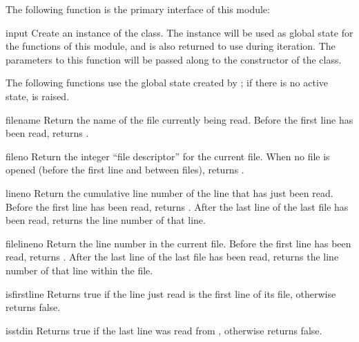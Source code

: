 The following function is the primary interface of this module:

\begin{funcdesc}{input}{}
  Create an instance of the  class.  The instance
  will be used as global state for the functions of this module, and
  is also returned to use during iteration.  The parameters to this
  function will be passed along to the constructor of the
   class.

\end{funcdesc}


The following functions use the global state created by
; if there is no active state,
 is raised.

\begin{funcdesc}{filename}{}
  Return the name of the file currently being read.  Before the first
  line has been read, returns .
\end{funcdesc}

\begin{funcdesc}{fileno}{}
  Return the integer ``file descriptor'' for the current file. When no
  file is opened (before the first line and between files), returns
  .
\end{funcdesc}

\begin{funcdesc}{lineno}{}
  Return the cumulative line number of the line that has just been
  read.  Before the first line has been read, returns .  After
  the last line of the last file has been read, returns the line
  number of that line.
\end{funcdesc}

\begin{funcdesc}{filelineno}{}
  Return the line number in the current file.  Before the first line
  has been read, returns .  After the last line of the last
  file has been read, returns the line number of that line within the
  file.
\end{funcdesc}

\begin{funcdesc}{isfirstline}{}
  Returns true if the line just read is the first line of its file,
  otherwise returns false.
\end{funcdesc}

\begin{funcdesc}{isstdin}{}
  Returns true if the last line was read from ,
  otherwise returns false.
\end{funcdesc}

